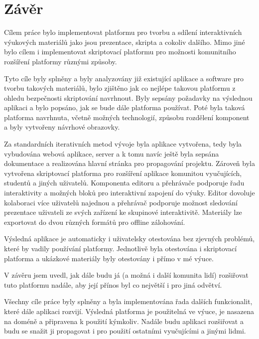 \chapter*{Závěr}

Cílem práce bylo implementovat platformu pro tvorbu a sdílení interaktivních výukových materiálů jako jsou prezentace, skripta a cokoliv dalšího.
Mimo jiné bylo cílem i implementovat skriptovací platformu pro možnosti komunitního rozšíření platformy různými způsoby.

Tyto cíle byly splněny a byly analyzovány již existující aplikace a software pro tvorbu takových materiálů, bylo zjištěno jak co nejlépe takovou platformu z ohledu bezpečnosti skriptování navrhnout.
Byly sepsány požadavky na výslednou aplikaci a bylo popsáno, jak se bude dále platforma používat.
Poté byla taková platforma navrhnuta, včetně možných technologií, způsobu rozdělení komponent a byly vytvořeny návrhové obrazovky.

Za standardních iterativních metod vývoje byla aplikace vytvořena, tedy byla vybudována webová aplikace, server a k tomu navíc ještě byla sepsána dokumentace a realizována hlavní stránka pro propagování projektu.
Zároveň byla vytvořena skriptovací platforma pro rozšíření aplikace komunitou vyučujících, studentů a jiných uživatelů.
Komponenta editoru a přehrávače podporuje řadu interaktivity a možných bloků pro interaktivní zapojení do výuky.
Editor dovoluje kolaboraci více uživatelů najednou a přehrávač podporuje možnost sledování prezentace uživateli ze svých zařízení ke skupinové interaktivitě.
Materiály lze exportovat do dvou různých formátů pro offline zálohování.

Výsledná aplikace je automaticky i uživatelsky otestována bez zjevných problémů, které by vadily používání platformy.
Jednotlivě byla otestována i skriptovací platforma a ukázkové materiály byly otestovány i přímo v mé výuce.

V závěru jsem uvedl, jak dále budu já (a možná i další komunita lidí) rozšiřovat tuto platformu nadále, aby její přínos byl co největší i pro jiná odvětví.

Všechny cíle práce byly splněny a byla implementována řada dalších funkcionalit, které dále aplikaci rozvijí.
Výsledná platforma je použitelná ve výuce, je nasazena na doméně a připravena k použití kýmkoliv.
Nadále budu aplikaci rozšiřovat a budu se snažit ji propagovat i pro použití ostatními vyučujícími a jinými lidmi.